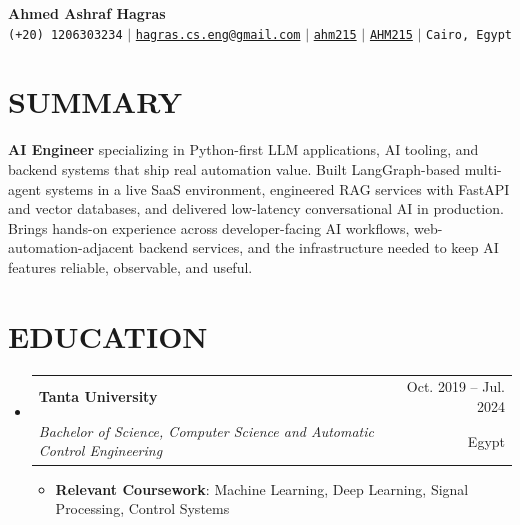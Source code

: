 \documentclass[letterpaper,11pt]{article}
\makeatletter
\newcommand{\resumeItem}[1]{
  \item\small{
    {#1 \vspace{-1pt}}
  }
}
\newcommand{\resumeSubheading}[4]{
  \vspace{-1pt}\item
    \begin{tabular*}{\textwidth}[t]{l@{\extracolsep{\fill}}r}
      \textbf{#1} & {\color{dark-grey}\small #2}\vspace{1pt}\\
      \textit{#3} & {\color{dark-grey} \small #4}\\
    \end{tabular*}\vspace{-4pt}
}
\newcommand{\resumeSubHeadingListStart}{\begin{itemize}[leftmargin=0in, label={}]}
\newcommand{\resumeSubHeadingListEnd}{\end{itemize}}
\newcommand{\resumeItemListStart}{\begin{itemize}}
\newcommand{\resumeItemListEnd}{\end{itemize}\vspace{0pt}}
\makeatother
\begin{document}
\begin{center}
    \textbf{\Huge Ahmed Ashraf Hagras} \\ \vspace{5pt}
    \small \faPhone* \texttt{(+20) 1206303234} \hspace{1pt} $|$
    \hspace{1pt} \faEnvelope \hspace{2pt} \href{mailto:hagras.cs.eng@gmail.com}{\texttt{hagras.cs.eng@gmail.com}} \hspace{1pt} $|$
    \hspace{1pt} \faLinkedin \hspace{2pt} \href{https://www.linkedin.com/in/ahm215}{\texttt{ahm215}} \hspace{1pt} $|$
    \hspace{1pt} \faGithub \hspace{2pt} \href{https://github.com/AHM215}{\texttt{AHM215}} \hspace{1pt} $|$
    \hspace{1pt} \faMapMarker* \hspace{2pt}\texttt{Cairo, Egypt}
    \\ \vspace{-3pt}
\end{center}

\section{SUMMARY}
\small{
\textbf{AI Engineer} specializing in Python-first LLM applications, AI tooling, and backend systems that ship real automation value. Built LangGraph-based multi-agent systems in a live SaaS environment, engineered RAG services with FastAPI and vector databases, and delivered low-latency conversational AI in production. Brings hands-on experience across developer-facing AI workflows, web-automation-adjacent backend services, and the infrastructure needed to keep AI features reliable, observable, and useful.
}

\section{EDUCATION}
  \resumeSubHeadingListStart
    \resumeSubheading
      {Tanta University}{Oct. 2019 -- Jul. 2024}
      {Bachelor of Science, Computer Science and Automatic Control Engineering}{Egypt}
      \resumeItemListStart
        \resumeItem{\textbf{Relevant Coursework}: Machine Learning, Deep Learning, Signal Processing, Control Systems}
      \resumeItemListEnd
  \resumeSubHeadingListEnd
\end{document}
